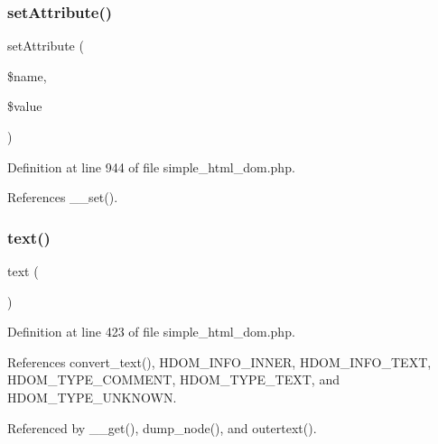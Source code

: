 \subsubsection{\texorpdfstring{set\+Attribute()}{setAttribute()}}
{\footnotesize\ttfamily set\+Attribute (\begin{DoxyParamCaption}\item[{}]{\$name,  }\item[{}]{\$value }\end{DoxyParamCaption})}



Definition at line 944 of file simple\+\_\+html\+\_\+dom.\+php.



References \+\_\+\+\_\+set().


\hypertarget{classsimple__html__dom__node_a37df362c2f77a0045fa8af094f432238}{}\label{classsimple__html__dom__node_a37df362c2f77a0045fa8af094f432238} 
\subsubsection{\texorpdfstring{text()}{text()}}
{\footnotesize\ttfamily text (\begin{DoxyParamCaption}{ }\end{DoxyParamCaption})}



Definition at line 423 of file simple\+\_\+html\+\_\+dom.\+php.



References convert\+\_\+text(), H\+D\+O\+M\+\_\+\+I\+N\+F\+O\+\_\+\+I\+N\+N\+ER, H\+D\+O\+M\+\_\+\+I\+N\+F\+O\+\_\+\+T\+E\+XT, H\+D\+O\+M\+\_\+\+T\+Y\+P\+E\+\_\+\+C\+O\+M\+M\+E\+NT, H\+D\+O\+M\+\_\+\+T\+Y\+P\+E\+\_\+\+T\+E\+XT, and H\+D\+O\+M\+\_\+\+T\+Y\+P\+E\+\_\+\+U\+N\+K\+N\+O\+WN.



Referenced by \+\_\+\+\_\+get(), dump\+\_\+node(), and outertext().



